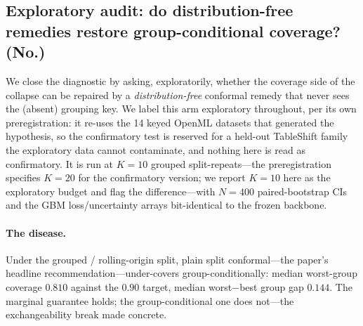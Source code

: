 \documentclass[11pt]{article}
\begin{document}
\subsection*{Exploratory audit: do distribution-free remedies restore group-conditional coverage? (No.)}
We close the diagnostic by asking, exploratorily, whether the coverage side of the collapse can be repaired by
a \emph{distribution-free} conformal remedy that never sees the (absent) grouping key. We label this arm
exploratory throughout, per its own preregistration: it re-uses the 14 keyed OpenML datasets that
generated the hypothesis, so the confirmatory test is reserved for a held-out TableShift family the
exploratory data cannot contaminate, and nothing here is read as confirmatory. It is run at $K{=}10$ grouped
split-repeats---the preregistration specifies $K{=}20$ for the confirmatory version; we report $K{=}10$ here
as the exploratory budget and flag the difference---with $N{=}400$ paired-bootstrap CIs and the GBM
loss/uncertainty arrays bit-identical to the frozen backbone.

\paragraph{The disease.} Under the grouped / rolling-origin split, plain split conformal---the paper's headline
recommendation---under-covers group-conditionally: median worst-group coverage $0.810$ against the
$0.90$ target, median worst$-$best group gap $0.144$. The marginal guarantee holds; the group-conditional one
does not---the exchangeability break made concrete.
\end{document}
